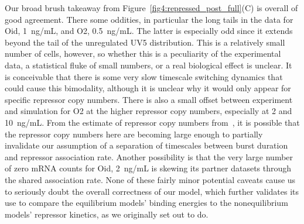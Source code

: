 Our broad brush takeaway from Figure~\ref{fig4:repressed_post_full}(C) is
overall of good agreement. There some oddities, in particular the long tails in
the data for Oid, 1~ng/mL, and O2, 0.5~ng/mL. The latter is especially odd since
it extends beyond the tail of the unregulated UV5 distribution. This is a
relatively small number of cells, however, so whether this is a peculiarity of
the experimental data, a statistical fluke of small numbers, or a real
biological effect is unclear. It is conceivable that there is some very slow
timescale switching dynamics that could cause this bimodality, although it is
unclear why it would only appear for specific repressor copy numbers. There is
also a small offset between experiment and simulation for O2 at the higher
repressor copy numbers, especially at 2 and 10~ng/mL. From the estimate of
repressor copy numbers from~\cite{Jones2014}, it is possible that the repressor
copy numbers here are becoming large enough to partially invalidate our
assumption of a separation of timescales between burst duration and repressor
association rate. Another possibility is that the very large number of zero mRNA
counts for Oid, 2~ng/mL is skewing its partner datasets through the shared
association rate. None of these fairly minor potential caveats cause us to
seriously doubt the overall correctness of our model, which further validates
its use to compare the equilibrium models' binding energies to the
nonequilibrium models' repressor kinetics, as we originally set out to do.
